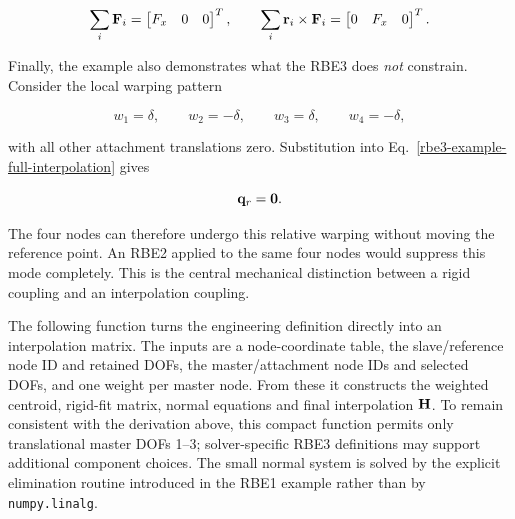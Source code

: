 \begin{equation}
    \sum_i\mathbf{F}_i
    =\begin{bmatrix}F_x&0&0\end{bmatrix}^{T},
    \qquad
    \sum_i\mathbf{r}_i\times\mathbf{F}_i
    =\begin{bmatrix}0&F_x&0\end{bmatrix}^{T}.
\end{equation}

Finally, the example also demonstrates what the RBE3 does \emph{not} constrain.
Consider the local warping pattern

\begin{equation}
    w_1=\delta,
    \qquad
    w_2=-\delta,
    \qquad
    w_3=\delta,
    \qquad
    w_4=-\delta,
\end{equation}

with all other attachment translations zero. Substitution into
Eq.~\eqref{rbe3-example-full-interpolation} gives

\begin{equation}
    \mathbf{q}_r=\mathbf{0}.
\end{equation}

The four nodes can therefore undergo this relative warping without moving the
reference point. An RBE2 applied to the same four nodes would suppress this mode
completely. This is the central mechanical distinction between a rigid coupling
and an interpolation coupling.

The following function turns the engineering definition directly into an
interpolation matrix. The inputs are a node-coordinate table, the slave/reference
node ID and retained DOFs, the master/attachment node IDs and selected DOFs, and
one weight per master node. From these it constructs the weighted centroid,
rigid-fit matrix, normal equations and final interpolation $\mathbf{H}$. To remain
consistent with the derivation above, this compact function permits only
translational master DOFs 1--3; solver-specific RBE3 definitions may support
additional component choices. The small normal system is solved by the explicit
elimination routine introduced in the RBE1 example rather than by
\texttt{numpy.linalg}.

